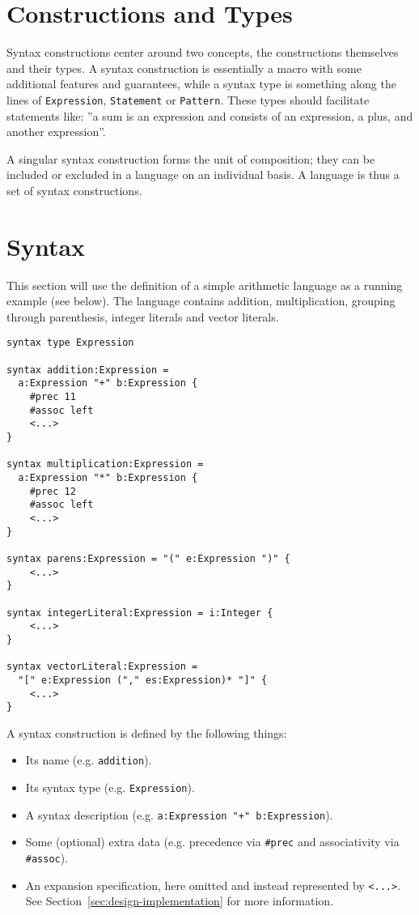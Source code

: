 \documentclass{kththesis}
\begin{document}
\section{Constructions and Types} \label{sec:constructions-and-types}

Syntax constructions center around two concepts, the constructions themselves and their types. A syntax construction is essentially a macro with some additional features and guarantees, while a syntax type is something along the lines of \texttt{Expression}, \texttt{Statement} or \texttt{Pattern}. These types should facilitate statements like: ''a sum is an expression and consists of an expression, a plus, and another expression''.

A singular syntax construction forms the unit of composition; they can be included or excluded in a language on an individual basis. A language is thus a set of syntax constructions.

\section{Syntax} \label{sec:design-syntax}

This section will use the definition of a simple arithmetic language as a running example (see below). The language contains addition, multiplication, grouping through parenthesis, integer literals and vector literals.

\begin{verbatim}
syntax type Expression

syntax addition:Expression =
  a:Expression "+" b:Expression {
    #prec 11
    #assoc left
    <...>
}

syntax multiplication:Expression =
  a:Expression "*" b:Expression {
    #prec 12
    #assoc left
    <...>
}

syntax parens:Expression = "(" e:Expression ")" {
    <...>
}

syntax integerLiteral:Expression = i:Integer {
    <...>
}

syntax vectorLiteral:Expression =
  "[" e:Expression ("," es:Expression)* "]" {
    <...>
}
\end{verbatim}

A syntax construction is defined by the following things:
\begin{itemize}
  \item Its name (e.g. \texttt{addition}).
  \item Its syntax type (e.g. \texttt{Expression}).
  \item A syntax description (e.g. \texttt{a:Expression "+" b:Expression}).
  \item Some (optional) extra data (e.g. precedence via \texttt{#prec} and associativity via \texttt{#assoc}).
  \item An expansion specification, here omitted and instead represented by \texttt{<...>}. See Section~\ref{sec:design-implementation} for more information.
\end{itemize}
\end{document}
